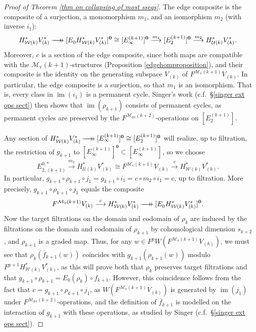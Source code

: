 \documentclass[11pt]{amsart} \renewcommand{\baselinestretch}{1.2}
\theoremstyle{plain}
\numberwithin{equation}{section} %
\theoremstyle{plain}
\numberwithin{equation}{chapter} %
\DeclareMathOperator{\im}{im}
\renewcommand{\to}{\longrightarrow}
\newcommand{\calU}{\mathcal{U}}
\newcommand{\calw}{\mathcal{W}}
\newcommand{\calMv}{\mathcal{M}\dver}
\newcommand{\calMhv}{\mathcal{M}_\mathrm{hv}}
\newcommand{\epi}{{\,\makebox[0cm][l]{\ensuremath\to}\to{}}}
\newcommand{\E}[5]{[E^{#1}_{#2}#3]^{#4}_{#5}}
\newcommand{\dver}{_\mathrm{v}}
\begin{document}
\begin{Calculations of HWn}
\begin{proof}[Proof of Theorem \ref{thm on collapsing of most sseqs}]
The edge composite is the composite of a surjection, a monomorphism $m_1$, and an isomorphism $m_2$ (with inverse $i_1$):
\[H^*_{\calw(k)}V^*_{(k)}\epi 
\E{}{0}{H^*_{\calw(k)}V^*_{(k)}}{\textbf{0}}{}
\cong
\E{(k+1)}{\infty}{}{\textbf{0}}{}
\overset{m_1}{\to} \E{(k+1)}{2}{}{\textbf{0}}{}
\overset{m_2}{\to}H^*_{\calU(k)}V^*_{(k)}.\]
Moreover, $c$ is a section of the edge composite, since both maps are compatible with the $\calMv(k+1)$-structures (Proposition \ref{edgehomproposition}), and their composite is the identity on the generating subspace $V_{(k)}$ of $F^{\calMv(k+1)}V_{(k)}$.
In particular, the edge composite is a surjection, so that $m_{1}$ is an isomorphism. That is, every class in $\im(i_1)$ is a permanent cycle. Singer's work (c.f.\ \S\ref{singer ext ops sect}) then shows that $\im(\rho_{k+1})$ consists of permanent cycles, as permanent cycles are preserved by the $F^{\calMhv(k+2)}$-operations on $\E{(k+1)}{2}{}{}{}$.


Any section of $H^*_{\calw(k)}V^*_{(k)}\epi \E{(k+1)}{\infty}{}{\textbf{0}}{}\cong \E{(k+1)}{2}{}{\textbf{0}}{} $ will realize, up to filtration, the restriction of $g_{k+1}$ to $\E{(k+1)}{\infty}{}{\textbf{0}}{} \subset \E{(k+1)}{\infty}{}{}{}$, so we choose
\[E_{2,(k+1)}^{0,*}\overset{m_2}{\to} H^*_{\calU(k)}V^*_{(k)}\cong F^{\calMv(k+1)}V_{(k)}\overset{c}{\to}H^*_{\calw(k)}V^*_{(k)}.\]
In particular, $g_{k+1}\circ \rho_{k+1}\circ j_1=g_{k+1}\circ i_1=c\circ m_2\circ i_1=c$, up to filtration. More precisely, $g_{k+1}\circ \rho_{k+1}\circ j_1$ equals the composite
\[
F^{\calMv(k+1)}V_{(k)}\overset{c}{\to} H^*_{\calw(k)}V^*_{(k)}\epi \E{}{0}{H^*_{\calw(k)}V^*_{(k)}}{\textbf{0}}{}.
\]
Now the target filtrations on the domain and codomain of $\rho_k$ are induced by the filtrations on the domain and codomain of $\rho_{k+1}$ by cohomological dimension $s_{k+2}$, and $\rho_{k+1}$ is a graded map. Thus, for any $w\in F^pW(F^{\calMv(k+1)}V_{(k)})$, we must see that $\rho_k(\overline{f}_{k+1}(w))$ coincides with $g_{k+1}(\rho_{k+1}(w))$ modulo $F^{p+1}H^*_{\calw(k)}V^*_{(k)}$, as this will prove both that $\rho_k$ preserves target filtrations and that  $g_{k+1}\circ \rho_{k+1}=E_0(\rho_{k})\circ f_{k+1}$. However, this coincidence follows from the fact that $c=g_{k+1}\circ \rho_{k+1}\circ j_1$, as $W(F^{\calMv(k+1)}V_{(k)})$ is generated by $\im(j_1)$ under $F^{\calMhv(k+2)}$-operations, and the definition of $\overline{f}_{k+1}$ is modelled on the interaction of $g_{k+1}$ with these operations, as studied by Singer (c.f.\ \S\ref{singer ext ops sect}).


\end{proof}
\end{Calculations of HWn}
\end{document}
